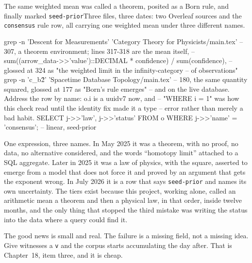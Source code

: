 \begin{Correspondence}{The same weighted mean was called a theorem, posited as a Born rule, and finally marked \texttt{seed-prior}}{Three files, three dates: two Overleaf sources and the \texttt{consensus} rule row, all carrying one weighted mean under three different names.}
\begin{Check}
grep -n 'Descent for Measurements' 'Category Theory for Physicists/main.tex'
    -- 307, a theorem environment; lines 317-318 are the mean itself,
    --   sum((arrow_data->>'value')::DECIMAL * confidence) / sum(confidence),
    --   glossed at 324 as "the weighted limit in the infinity-category
    --   of observations"
grep -n 'c_b\^2' 'Spacetime Database Topology/main.tex'
    -- 180, the same quantity squared, glossed at 177 as "Born's rule emerges"
-- and on the live database. Address the row by name: o.i is a uuidv7 now, and
-- "WHERE i = 1" was how this check read until the identity fix made it a type
-- error rather than merely a bad habit.
SELECT j->>'law', j->>'status' FROM o WHERE j->>'name' = 'consensus';
    -- linear, seed-prior
\end{Check}
One expression, three names. In May 2025 it was a theorem, with no proof, no data, no alternative considered, and the words ``homotopy limit'' attached to a SQL aggregate. Later in 2025 it was a law of physics, with the square, asserted to emerge from a model that does not force it and proved by an argument that gets the exponent wrong. In July 2026 it is a row that says \texttt{seed-prior} and names its own uncertainty. The tiers exist because this project, working alone, called an arithmetic mean a theorem and then a physical law, in that order, inside twelve months, and the only thing that stopped the third mistake was writing the status into the data where a query could find it.
\end{Correspondence}

The good news is small and real. The failure is a missing field, not a missing idea. Give witnesses a \texttt{v} and the corpus starts accumulating the day after. That is Chapter~18, item three, and it is cheap.
